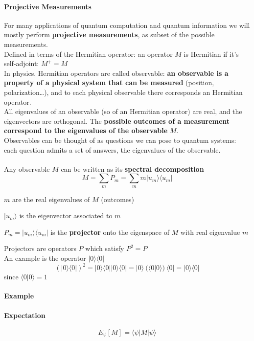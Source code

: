 \documentclass[10pt]{report}
\begin{document}
\paragraph{Projective Measurements} For many applications of quantum computation and quantum information we will mostly perform \textbf{projective measurements}, as subset of the possible measurements.\\
Defined in terms of the Hermitian operator: an operator $M$ is Hermitian if it's self-adjoint: $M^+ = M$\\
In physics, Hermitian operators are called observable: \textbf{an observable is a property of a physical system that can be measured} (position, polarization\ldots), and to each physical observable there corresponds an Hermitian operator.\\
All eigenvalues of an observable (so of an Hermitian operator) are real, and the eigenvectors are orthogonal. The \textbf{possible outcomes of a measurement correspond to the eigenvalues of the observable} $M$.\\
Observables can be thought of as questions we can pose to quantum systems: each question admits a set of answers, the eigenvalues of the observable.\\\\Any observable $M$ can be written as its \textbf{spectral decomposition} $$M = \sum_m P_m = \sum_m m|u_m\rangle\langle u_m|$$
\begin{list}{}{}
	\item $m$ are the real eigenvalues of $M$ (outcomes)
	\item $|u_m\rangle$ is the eigenvector associated to $m$
	\item $P_m = |u_m\rangle\langle u_m|$ is the \textbf{projector} onto the eigenspace of $M$ with real eigenvalue $m$
\end{list}
Projectors are operators $P$ which satisfy $P^2 = P$\\
An example is the operator $|0\rangle\langle0|$ $$(|0\rangle\langle0|)^2 = |0\rangle\langle0||0\rangle\langle0| = |0\rangle\:(\langle0|0\rangle)\:\langle0| = |0\rangle\langle0|$$ since $\langle0|0\rangle = 1$
\paragraph{Example} %
\paragraph{Expectation}
$$E_\psi[M] = \langle\psi|M|\psi\rangle$$
\end{document}

